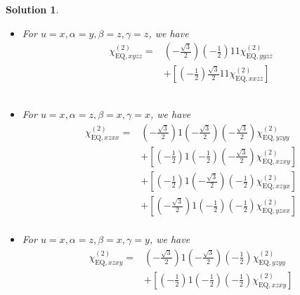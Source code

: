 \documentclass[UTF8,10pt,a4paper]{article}
\theoremstyle{Problem}
\theoremstyle{Solution}
\newtheorem*{sol}{Solution}
\begin{document}
\begin{sol}
\begin{itemize}
\begin{align}
\nonumber&+\left[\left(-\frac{1}{2}\right)\frac{\sqrt{3}}{2}1\left(-\frac{1}{2}\right)\chi_{\text{EQ},xxzy}^{(2)}\right]\\
\nonumber&+\left[\left(-\frac{1}{2}\right)\left(-\frac{1}{2}\right)1\frac{\sqrt{3}}{2}\chi_{\text{EQ},xyzx}^{(2)}\right]\\
\nonumber&+\left[\left(-\frac{\sqrt{3}}{2}\right)\frac{\sqrt{3}}{2}1\frac{\sqrt{3}}{2}\chi_{\text{EQ},yxzx}^{(2)}\right]\\
&
\end{align}\normalsize
\item For $u=x,\alpha=y,\beta=z,\gamma=z$, we have
\footnotesize\begin{align}
\nonumber\chi_{\text{EQ},xyzz}^{(2)}=&\left(-\frac{\sqrt{3}}{2}\right)\left(-\frac{1}{2}\right)11\chi_{\text{EQ},yyzz}^{(2)}\\
\nonumber&+\left[\left(-\frac{1}{2}\right)\frac{\sqrt{3}}{2}11\chi_{\text{EQ},xxzz}^{(2)}\right]\\
\nonumber&\\
\nonumber&\\
&
\end{align}\normalsize
\item For $u=x,\alpha=z,\beta=x,\gamma=x$, we have
\footnotesize\begin{align}
\nonumber\chi_{\text{EQ},xzxx}^{(2)}=&\left(-\frac{\sqrt{3}}{2}\right)1\left(-\frac{\sqrt{3}}{2}\right)\left(-\frac{\sqrt{3}}{2}\right)\chi_{\text{EQ},yzyy}^{(2)}\\
\nonumber&+\left[\left(-\frac{1}{2}\right)1\left(-\frac{1}{2}\right)\left(-\frac{\sqrt{3}}{2}\right)\chi_{\text{EQ},xzxy}^{(2)}\right]\\
\nonumber&+\left[\left(-\frac{1}{2}\right)1\left(-\frac{\sqrt{3}}{2}\right)\left(-\frac{1}{2}\right)\chi_{\text{EQ},xzyx}^{(2)}\right]\\
\nonumber&+\left[\left(-\frac{\sqrt{3}}{2}\right)1\left(-\frac{1}{2}\right)\left(-\frac{1}{2}\right)\chi_{\text{EQ},yzxx}^{(2)}\right]\\
&
\end{align}\normalsize
\item For $u=x,\alpha=z,\beta=x,\gamma=y$, we have
\footnotesize\begin{align}
\nonumber\chi_{\text{EQ},xzxy}^{(2)}=&\left(-\frac{\sqrt{3}}{2}\right)1\left(-\frac{\sqrt{3}}{2}\right)\left(-\frac{1}{2}\right)\chi_{\text{EQ},yzyy}^{(2)}\\
\nonumber&+\left[\left(-\frac{1}{2}\right)1\left(-\frac{1}{2}\right)\left(-\frac{1}{2}\right)\chi_{\text{EQ},xzxy}^{(2)}\right]\\

\end{align}
\end{itemize}
\end{sol}
\end{document}
